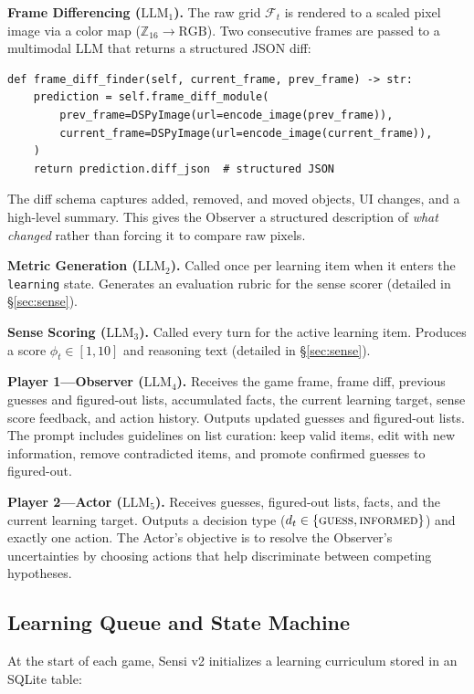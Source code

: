 \documentclass[11pt,letterpaper]{article}
\begin{document}
\textbf{Frame Differencing ($\text{LLM}_1$).} The raw grid $\mathcal{F}_t$ is rendered to a scaled pixel image via a color map ($\mathbb{Z}_{16} \to \text{RGB}$). Two consecutive frames are passed to a multimodal LLM that returns a structured JSON diff:
\begin{lstlisting}[caption={Frame differencing module.},label=lst:framediff]
def frame_diff_finder(self, current_frame, prev_frame) -> str:
    prediction = self.frame_diff_module(
        prev_frame=DSPyImage(url=encode_image(prev_frame)),
        current_frame=DSPyImage(url=encode_image(current_frame)),
    )
    return prediction.diff_json  # structured JSON
\end{lstlisting}
The diff schema captures added, removed, and moved objects, UI changes, and a high-level summary.
This gives the Observer a structured description of \emph{what changed} rather than forcing it to compare raw pixels.

\textbf{Metric Generation ($\text{LLM}_2$).} Called once per learning item when it enters the \texttt{learning} state. Generates an evaluation rubric for the sense scorer (detailed in \S\ref{sec:sense}).

\textbf{Sense Scoring ($\text{LLM}_3$).} Called every turn for the active learning item. Produces a score $\phi_t \in [1, 10]$ and reasoning text (detailed in \S\ref{sec:sense}).

\textbf{Player 1---Observer ($\text{LLM}_4$).} Receives the game frame, frame diff, previous guesses and figured-out lists, accumulated facts, the current learning target, sense score feedback, and action history. Outputs updated guesses and figured-out lists. The prompt includes guidelines on list curation: keep valid items, edit with new information, remove contradicted items, and promote confirmed guesses to figured-out.

\textbf{Player 2---Actor ($\text{LLM}_5$).} Receives guesses, figured-out lists, facts, and the current learning target. Outputs a decision type ($d_t \in \{\textsc{guess}, \textsc{informed}\}$) and exactly one action. The Actor's objective is to resolve the Observer's uncertainties by choosing actions that help discriminate between competing hypotheses.

\subsection{Learning Queue and State Machine}
\label{sec:curriculum}

At the start of each game, Sensi v2 initializes a learning curriculum stored in an SQLite table:
\end{document}

